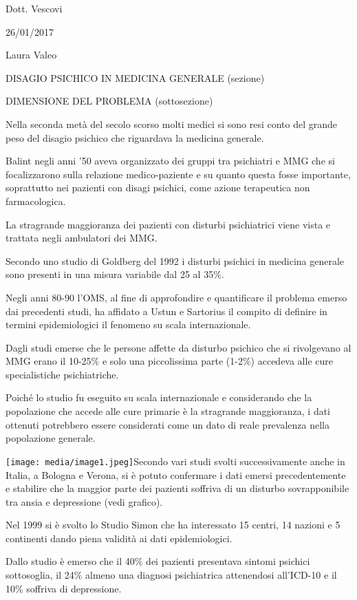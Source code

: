 \documentclass[]{article}
\date{}
\begin{document}
Dott. Vescovi

26/01/2017

Laura Valeo

DISAGIO PSICHICO IN MEDICINA GENERALE (sezione)

DIMENSIONE DEL PROBLEMA (sottosezione)

Nella seconda metà del secolo scorso molti medici si sono resi conto del
grande peso del disagio psichico che riguardava la medicina generale.

Balint negli anni '50 aveva organizzato dei gruppi tra psichiatri e MMG
che si focalizzarono sulla relazione medico-paziente e su quanto questa
fosse importante, soprattutto nei pazienti con disagi psichici, come
azione terapeutica non farmacologica.

La stragrande maggioranza dei pazienti con disturbi psichiatrici viene
vista e trattata negli ambulatori dei MMG.

Secondo uno studio di Goldberg del 1992 i disturbi psichici in medicina
generale sono presenti in una misura variabile dal 25 al 35\%.

Negli anni 80-90 l'OMS, al fine di approfondire e quantificare il
problema emerso dai precedenti studi, ha affidato a Ustun e Sartorius il
compito di definire in termini epidemiologici il fenomeno su scala
internazionale.

Dagli studi emerse che le persone affette da disturbo psichico che si
rivolgevano al MMG erano il 10-25\% e solo una piccolissima parte
(1-2\%) accedeva alle cure specialistiche psichiatriche.

Poiché lo studio fu eseguito su scala internazionale e considerando che
la popolazione che accede alle cure primarie è la stragrande
maggioranza, i dati ottenuti potrebbero essere considerati come un dato
di reale prevalenza nella popolazione generale.

\texttt{[image: media/image1.jpeg]}Secondo
vari studi svolti successivamente anche in Italia, a Bologna e Verona,
si è potuto confermare i dati emersi precedentemente e stabilire che la
maggior parte dei pazienti soffriva di un disturbo sovrapponibile tra
ansia e depressione (vedi grafico).

Nel 1999 si è svolto lo Studio Simon che ha interessato 15 centri, 14
nazioni e 5 continenti dando piena validità ai dati epidemiologici.

Dallo studio è emerso che il 40\% dei pazienti presentava sintomi
psichici sottosoglia, il 24\% almeno una diagnosi psichiatrica
attenendosi all'ICD-10 e il 10\% soffriva di depressione.
\end{document}
